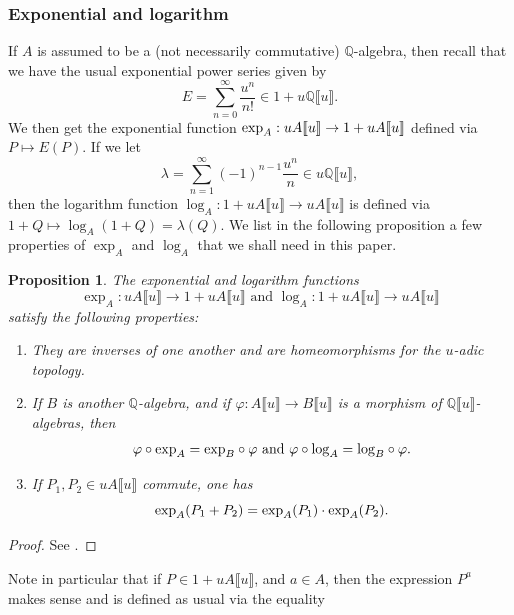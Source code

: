\documentclass[11pt]{amsart}
\newtheorem{proposition}[theorem]{Proposition}
\numberwithin{equation}{section}
\theoremstyle{remark}
\theoremstyle{definition}
\begin{document}
\subsubsection{Exponential and logarithm} \label{section:exp}
If $A$ is assumed to be a (not necessarily commutative) $\mathbb{Q}$-algebra, then recall that we have the usual exponential power series given by
$$E = \sum_{n=0}^{\infty} \frac{u^{n}}{n!} \in 1 + u\mathbb{Q}\llbracket u \rrbracket. $$
We then get the exponential function ${\rm exp}_{A}: u A\llbracket u \rrbracket \rightarrow 1 + u A \llbracket u \rrbracket$ defined via $P \mapsto E(P)$.  If we let 
$$\lambda = \sum_{n=1}^{\infty}(-1)^{n-1} \frac{u^{n}}{n} \in u \mathbb{Q} \llbracket u \rrbracket, $$
then the logarithm function $\log_{A}:1 + u A \llbracket u \rrbracket \rightarrow u A\llbracket u \rrbracket$ is defined via $1 + Q \mapsto \log_{A}(1+Q) = \lambda(Q)$.
We list in the following proposition a few properties of $\exp_{A}$ and $\log_{A}$ that we shall need in this paper.
\begin{proposition} \label{basic_prop} 
The exponential and logarithm functions 
$$\exp_{A}:u A\llbracket u \rrbracket \rightarrow 1 + u A\llbracket u \rrbracket \text{ and } \log_{A}:1 + u A \llbracket u \rrbracket \rightarrow u A\llbracket u \rrbracket$$ 
satisfy the following properties:
\begin{enumerate}
\item They are inverses of one another and are homeomorphisms for the $u$-adic topology.
\item If $B$ is another $\mathbb{Q}$-algebra, and if $\varphi:A\llbracket u \rrbracket \rightarrow B\llbracket u \rrbracket$ is a morphism of $\mathbb{Q}\llbracket u \rrbracket$-algebras, then
$$\varphi \circ {\rm exp}_{A} = {\rm exp}_{B} \circ \varphi \text{ and } \varphi \circ {\rm log}_{A} = {\rm log}_{B} \circ \varphi.$$
\item If $P_{1}, P_{2} \in u A \llbracket u \rrbracket$ commute, one has
$${\rm exp}_{A}(P_{1} + P_{2}) = {\rm exp}_{A}(P_{1}) \cdot {\rm exp}_{A}(P_{2}). $$
\end{enumerate}
\end{proposition} 
\begin{proof}
See \cite[II, \S 6, no.1]{Bourbaki:1998}. 
\end{proof}
Note in particular that if $P \in 1 + uA\llbracket u \rrbracket$, and $a \in A$, then the expression $P^{a} $ makes sense and is defined as usual via the equality
\end{document}
